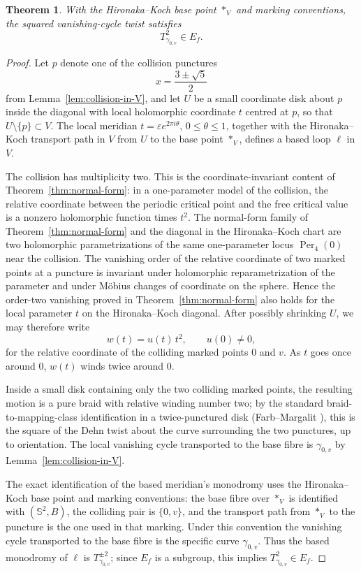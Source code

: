 \documentclass[12pt]{article}
\newtheorem{theorem}{Theorem}[section]
\theoremstyle{definition}
\theoremstyle{remark}
\numberwithin{equation}{section}
\newcommand{\Sph}{\mathbb S}
\newcommand{\Ef}{E_f}
\newcommand{\Per}{\operatorname{Per}}
\begin{document}
\begin{theorem}
\label{thm:Ef}
With the Hironaka--Koch base point $*_{V}$ and marking conventions, the
squared vanishing-cycle twist satisfies
\[
T_{\gamma_{0,v}}^{2}\in\Ef.
\]
\end{theorem}
\begin{proof}
Let $p$ denote one of the collision punctures
\[
x=\frac{3\pm\sqrt5}{2}
\]
from Lemma~\ref{lem:collision-in-V}, and let $U$ be a small coordinate
disk about $p$ inside the diagonal with local holomorphic coordinate
$t$ centred at $p$, so that $U\setminus\{p\}\subset V$.  The local
meridian $t=\varepsilon e^{2\pi i\theta}$, $0\le\theta\le1$, together
with the Hironaka--Koch transport path in $V$ from $U$ to the base
point $*_{V}$, defines a based loop $\ell$ in $V$.

The collision has multiplicity two.  This is the coordinate-invariant
content of Theorem~\ref{thm:normal-form}: in a one-parameter model of
the collision, the relative coordinate between the periodic critical
point and the free critical value is a nonzero holomorphic function
times $t^{2}$.  The normal-form family of Theorem~\ref{thm:normal-form}
and the diagonal in the Hironaka--Koch chart are two holomorphic
parametrizations of the same one-parameter locus $\Per_{4}(0)$ near the
collision.  The vanishing order of the relative coordinate of two marked
points at a puncture is invariant under holomorphic reparametrization of
the parameter and under M\"obius changes of coordinate on the sphere.
Hence the order-two vanishing proved in Theorem~\ref{thm:normal-form}
also holds for the local parameter $t$ on the Hironaka--Koch diagonal.
After possibly shrinking $U$, we may therefore write
\[
w(t)=u(t)\,t^{2},\qquad u(0)\neq0,
\]
for the relative coordinate of the colliding marked points $0$ and $v$.
As $t$ goes once around $0$, $w(t)$ winds twice around $0$.

Inside a small disk containing only the two colliding marked points, the
resulting motion is a pure braid with relative winding number two; by
the standard braid-to-mapping-class identification in a twice-punctured
disk (Farb--Margalit \cite[Chapter~9, Theorem~9.1 and \S9.1]{FM}), this
is the square of the Dehn twist about the curve surrounding the two
punctures, up to orientation.  The local vanishing cycle transported to
the base fibre is $\gamma_{0,v}$ by
Lemma~\ref{lem:collision-in-V}.

The exact identification of the based meridian's monodromy uses the
Hironaka--Koch base point and marking conventions: the base fibre over
$*_{V}$ is identified with $(\Sph^{2},B)$, the colliding pair is
$\{0,v\}$, and the transport path from $*_{V}$ to the puncture is the
one used in that marking.  Under this convention the vanishing cycle
transported to the base fibre is the specific curve $\gamma_{0,v}$.
Thus the based monodromy of $\ell$ is $T_{\gamma_{0,v}}^{\pm2}$; since
$\Ef$ is a subgroup, this implies $T_{\gamma_{0,v}}^{2}\in\Ef$.
\end{proof}
\end{document}
